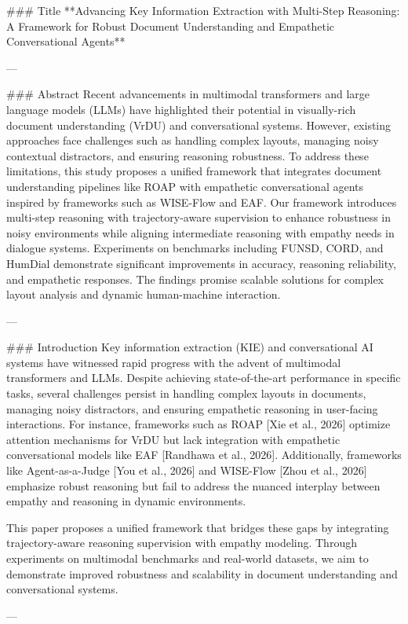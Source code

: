 ### Title  
**Advancing Key Information Extraction with Multi-Step Reasoning: A Framework for Robust Document Understanding and Empathetic Conversational Agents**

---

### Abstract  
Recent advancements in multimodal transformers and large language models (LLMs) have highlighted their potential in visually-rich document understanding (VrDU) and conversational systems. However, existing approaches face challenges such as handling complex layouts, managing noisy contextual distractors, and ensuring reasoning robustness. To address these limitations, this study proposes a unified framework that integrates document understanding pipelines like ROAP with empathetic conversational agents inspired by frameworks such as WISE-Flow and EAF. Our framework introduces multi-step reasoning with trajectory-aware supervision to enhance robustness in noisy environments while aligning intermediate reasoning with empathy needs in dialogue systems. Experiments on benchmarks including FUNSD, CORD, and HumDial demonstrate significant improvements in accuracy, reasoning reliability, and empathetic responses. The findings promise scalable solutions for complex layout analysis and dynamic human-machine interaction.

---

### Introduction  
Key information extraction (KIE) and conversational AI systems have witnessed rapid progress with the advent of multimodal transformers and LLMs. Despite achieving state-of-the-art performance in specific tasks, several challenges persist in handling complex layouts in documents, managing noisy distractors, and ensuring empathetic reasoning in user-facing interactions. For instance, frameworks such as ROAP [Xie et al., 2026] optimize attention mechanisms for VrDU but lack integration with empathetic conversational models like EAF [Randhawa et al., 2026]. Additionally, frameworks like Agent-as-a-Judge [You et al., 2026] and WISE-Flow [Zhou et al., 2026] emphasize robust reasoning but fail to address the nuanced interplay between empathy and reasoning in dynamic environments.

This paper proposes a unified framework that bridges these gaps by integrating trajectory-aware reasoning supervision with empathy modeling. Through experiments on multimodal benchmarks and real-world datasets, we aim to demonstrate improved robustness and scalability in document understanding and conversational systems.

---

